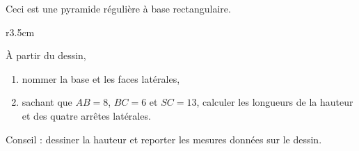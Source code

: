 
\begin{exercice}\label{exo2smath-0181}

    Ceci est une pyramide régulière à base rectangulaire.

\begin{wrapfigure}{r}{3.5cm}
   \vspace{-0.5cm}        %
   \centering
   
\end{wrapfigure}
À partir du dessin,
\begin{enumerate}
    \item
        nommer la base et les faces latérales,
    \item
        sachant que \( AB=8\), \( BC=6\) et \( SC=13\), calculer les longueurs de la hauteur et des quatre arrêtes latérales.
\end{enumerate}

Conseil : dessiner la hauteur et reporter les mesures données sur le dessin.

\end{exercice}
